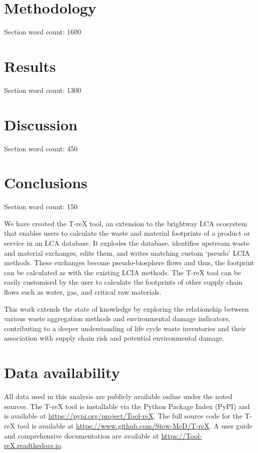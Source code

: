 \documentclass[review,3p,authoryear]{elsarticle}
\newcommand{\cbox}[1]{
    \begin{tcolorbox}[hbox, colback=red!5!white, colframe=red!65!black, boxrule=0.25pt, boxsep=2pt, left=2pt, right=2pt, top=1pt, bottom=1pt]
        \small\sffamily #1
    \end{tcolorbox}
}
\begin{document}
\section{Methodology}
\label{sec:methodology}
\cbox{Section word count: 1600}


\section{Results}
\cbox{Section word count: 1300}
\label{sec:results}


\section{Discussion}
\label{sec:discussion}

\cbox{Section word count: 450}

\section{Conclusions}
\label{sec:conclusions}
\cbox{Section word count: 150}
We have created the T-reX tool, an extension to the brightway LCA ecosystem that enables users to calculate the waste and material footprints of a product or service in an LCA database. It explodes the database, identifies upstream waste and material exchanges, edits them, and writes matching custom `pseudo' LCIA methods. These exchanges become pseudo-biosphere flows and thus, the footprint can be calculated as with the existing LCIA methods. The T-reX tool can be easily customised by the user to calculate the footprints of other supply chain flows such as water, gas, and critical raw materials.

This work extends the state of knowledge by exploring the relationship between various waste aggregation methods and environmental damage indicators, contributing to a deeper understanding of life cycle waste inventories and their association with supply chain risk and potential environmental damage.


\section*{Data availability} 
All data used in this analysis are publicly available online under the noted sources. The T-reX tool is installable via the Python Package Index (PyPI) and is available at \url{https://pypi.org/project/Tool-reX}.
The full source code for the T-reX tool is available at \url{https://www.github.com/Stew-McD/T-reX}.
A user guide and comprehensive documentation are available at \url{https://Tool-reX.readthedocs.io}.
\end{document}
